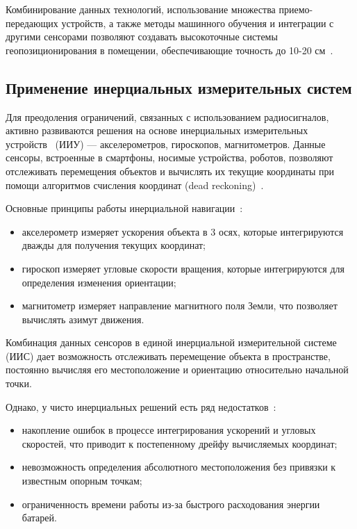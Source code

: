 Комбинирование данных технологий, использование множества приемо-передающих устройств, а также методы машинного обучения и интеграции с другими сенсорами позволяют создавать высокоточные системы геопозиционирования в помещении, обеспечивающие точность до 10-20 см~\cite{basebook}.

\subsection{Применение инерциальных измерительных систем}

Для преодоления ограничений, связанных с использованием радиосигналов, активно развиваются решения на основе инерциальных измерительных устройств~\cite{inertial} (ИИУ) --- акселерометров, гироскопов, магнитометров. Данные сенсоры, встроенные в смартфоны, носимые устройства, роботов, позволяют отслеживать перемещения объектов и вычислять их текущие координаты при помощи алгоритмов счисления координат (dead reckoning)~\cite{inertialsys}.

Основные принципы работы инерциальной навигации~\cite{inertialprinciples}:

\begin{itemize}[label=---]
    \item акселерометр измеряет ускорения объекта в 3 осях, которые интегрируются дважды для получения текущих координат;
    \item гироскоп измеряет угловые скорости вращения, которые интегрируются для определения изменения ориентации;
    \item магнитометр измеряет направление магнитного поля Земли, что позволяет вычислять азимут движения.
\end{itemize}

Комбинация данных сенсоров в единой инерциальной измерительной системе (ИИС) дает возможность отслеживать перемещение объекта в пространстве, постоянно вычисляя его местоположение и ориентацию относительно начальной точки.

Однако, у чисто инерциальных решений есть ряд недостатков~\cite{basebook}:

\begin{itemize}[label=---]
    \item накопление ошибок в процессе интегрирования ускорений и угловых скоростей, что приводит к постепенному дрейфу вычисляемых координат;
    \item невозможность определения абсолютного местоположения без привязки к известным опорным точкам;
    \item ограниченность времени работы из-за быстрого расходования энергии батарей.
\end{itemize}

